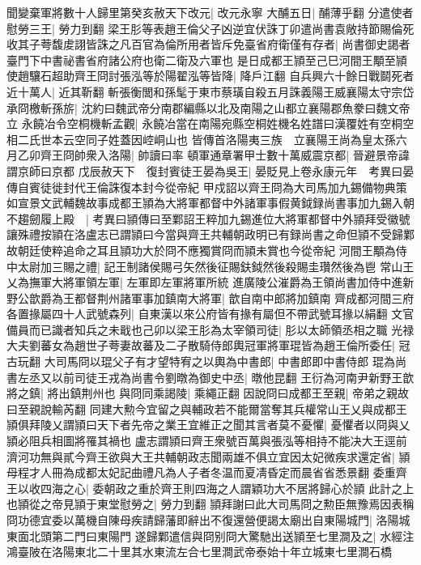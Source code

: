 聞變棄軍將數十人歸里第癸亥赦天下改元|{
	改元永寧}
大酺五日|{
	酺薄乎翻}
分遣使者慰勞三王|{
	勞力到翻}
梁王肜等表趙王倫父子凶逆宜伏誅丁卯遣尚書袁敞持節賜倫死收其子荂馥䖍詡皆誅之凡百官為倫所用者皆斥免臺省府衛僅有存者|{
	尚書御史謁者臺門下中書祕書省府諸公府也衛二衛及六軍也}
是日成都王頴至己巳河間王顒至頴使趙驤石超助齊王冏討張泓等於陽翟泓等皆降|{
	降戶江翻}
自兵興六十餘日戰鬬死者近十萬人|{
	近其靳翻}
斬張衡閭和孫髦于東市蔡璜自殺五月誅義陽王威襄陽太守宗岱承冏檄斬孫旂|{
	沈約曰魏武帝分南郡編縣以北及南陽之山都立襄陽郡魚豢曰魏文帝立}
永饒冶令空桐機斬孟觀|{
	永饒冶當在南陽宛縣空桐姓機名姓譜曰漢覆姓有空桐空相二氏世本云空同子姓蓋因崆峒山也}
皆傳首洛陽夷三族　立襄陽王尚為皇太孫六月乙卯齊王冏帥衆入洛陽|{
	帥讀曰率}
頓軍通章署甲士數十萬威震京都|{
	晉避景帝諱謂京師曰京都}
戊辰赦天下　復封賓徒王晏為吳王|{
	晏貶見上卷永康元年　考異曰晏傳自賓徒徙封代王倫誅復本封今從帝紀}
甲戍詔以齊王冏為大司馬加九錫備物典策如宣景文武輔魏故事成都王頴為大將軍都督中外諸軍事假黄鉞録尚書事加九錫入朝不趨劒履上殿　|{
	考異曰頴傳曰至鄴詔王粹加九錫進位大將軍都督中外頴拜受徽號讓殊禮按頴在洛盧志已謂頴曰今當與齊王共輔朝政明已有録尚書之命但頴不受歸鄴故朝廷使粹追命之耳且頴功大於冏不應獨賞冏而頴未賞也今從帝紀}
河間王顒為侍中太尉加三賜之禮|{
	記王制諸侯賜弓矢然後征賜鈇鉞然後殺賜圭瓚然後為鬯}
常山王乂為撫軍大將軍領左軍|{
	左軍即左軍將軍所統}
進廣陵公漼爵為王領尚書加侍中進新野公歆爵為王都督荆州諸軍事加鎮南大將軍|{
	歆自南中郎將加鎮南}
齊成都河間三府各置掾屬四十人武號森列|{
	自東漢以來公府皆有掾有屬但不帶武號耳掾以絹翻}
文官備員而已識者知兵之未戢也己卯以梁王肜為太宰領司徒|{
	肜以太師領丞相之職}
光禄大夫劉蕃女為趙世子荂妻故蕃及二子散騎侍郎輿冠軍將軍琨皆為趙王倫所委任|{
	冠古玩翻}
大司馬冏以琨父子有才望特宥之以輿為中書郎|{
	中書郎即中書侍郎}
琨為尚書左丞又以前司徒王戎為尚書令劉暾為御史中丞|{
	暾他昆翻}
王衍為河南尹新野王歆將之鎮|{
	將出鎮荆州也}
與冏同乘謁陵|{
	乘繩正翻}
因說冏曰成都王至親|{
	帝弟之親故曰至親說輸芮翻}
同建大勲今宜留之與輔政若不能爾當奪其兵權常山王乂與成都王頴俱拜陵乂謂頴曰天下者先帝之業王宜維正之聞其言者莫不憂懼|{
	憂懼者以冏與乂頴必阻兵相圖將罹其禍也}
盧志謂頴曰齊王衆號百萬與張泓等相持不能决大王逕前濟河功無與貳今齊王欲與大王共輔朝政志聞兩雄不俱立宜因太妃微疾求還定省|{
	頴母程才人冊為成都太妃記曲禮凡為人子者冬温而夏凊昏定而晨省省悉景翻}
委重齊王以收四海之心|{
	委朝政之重於齊王則四海之人謂穎功大不居將歸心於頴}
此計之上也頴從之帝見頴于東堂慰勞之|{
	勞力到翻}
頴拜謝曰此大司馬冏之勲臣無豫焉因表稱冏功德宜委以萬機自陳母疾請歸藩即辭出不復還營便謁太廟出自東陽城門|{
	洛陽城東面北頭第二門曰東陽門}
遂歸鄴遣信與冏别冏大驚馳出送頴至七里澗及之|{
	水經注鴻臺陂在洛陽東北二十里其水東流左合七里澗武帝泰始十年立城東七里澗石橋}
